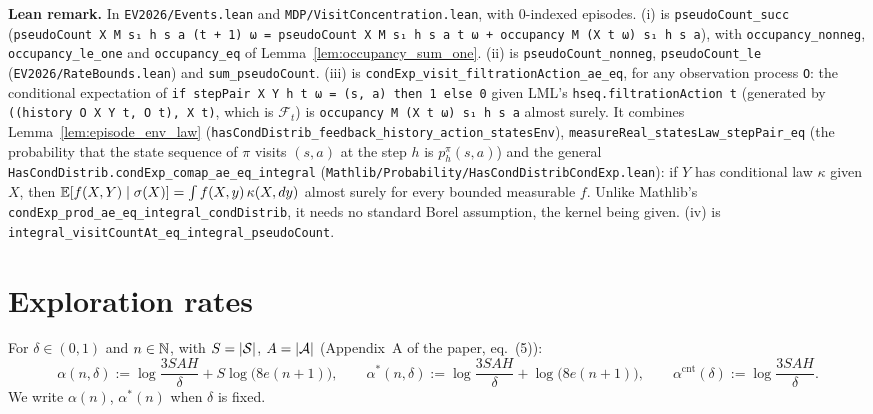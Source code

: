 \textbf{Lean remark.} In \texttt{EV2026/Events.lean} and \texttt{MDP/VisitConcentration.lean}, with
$0$-indexed episodes. (i) is \texttt{pseudoCount\_succ}
(\texttt{pseudoCount X M s₁ h s a (t + 1) ω = pseudoCount X M s₁ h s a t ω + occupancy M (X t ω) s₁ h s a}),
with \texttt{occupancy\_nonneg}, \texttt{occupancy\_le\_one} and \texttt{occupancy\_eq} of
Lemma~\ref{lem:occupancy_sum_one}. (ii) is \texttt{pseudoCount\_nonneg}, \texttt{pseudoCount\_le}
(\texttt{EV2026/RateBounds.lean}) and \texttt{sum\_pseudoCount}. (iii) is
\texttt{condExp\_visit\_filtrationAction\_ae\_eq}, for any observation process \texttt{O}: the
conditional expectation of \texttt{if stepPair X Y h t ω = (s, a) then 1 else 0} given LML's
\texttt{hseq.filtrationAction t} (generated by \texttt{((history O X Y t, O t), X t)}, which is
$\mathcal F_t$) is \texttt{occupancy M (X t ω) s₁ h s a} almost surely. It combines
Lemma~\ref{lem:episode_env_law} (\texttt{hasCondDistrib\_feedback\_history\_action\_statesEnv}),
\texttt{measureReal\_statesLaw\_stepPair\_eq} (the probability that the state sequence of $\pi$
visits $(s, a)$ at the step $h$ is $p^\pi_h(s, a)$) and the general
\texttt{HasCondDistrib.condExp\_comap\_ae\_eq\_integral} (\texttt{Mathlib/Probability/HasCondDistribCondExp.lean}):
if $Y$ has conditional law $\kappa$ given $X$, then $\mathbb{E}[f(X, Y) \mid \sigma(X)] = \int f(X, y)\,\kappa(X, dy)$
almost surely for every bounded measurable $f$. Unlike Mathlib's
\texttt{condExp\_prod\_ae\_eq\_integral\_condDistrib}, it needs no standard Borel assumption, the
kernel being given. (iv) is \texttt{integral\_visitCountAt\_eq\_integral\_pseudoCount}.

\section{Exploration rates}
\label{sec:empirical_rates}

\begin{definition}\label{def:rates}
\leanok
{}
For $\delta \in (0, 1)$ and $n \in \mathbb{N}$, with $S = \lvert \mathcal{S} \rvert$, $A = \lvert \mathcal{A} \rvert$ (Appendix~A of the
paper, eq.~(5)):
\[
  \alpha(n, \delta) := \log\frac{3 S A H}{\delta} + S \log\big(8 e (n + 1)\big),
  \qquad
  \alpha^*(n, \delta) := \log\frac{3 S A H}{\delta} + \log\big(8 e (n + 1)\big),
  \qquad
  \alpha^{\mathrm{cnt}}(\delta) := \log\frac{3 S A H}{\delta} .
\]
We write $\alpha(n)$, $\alpha^*(n)$ when $\delta$ is fixed.
\end{definition}

